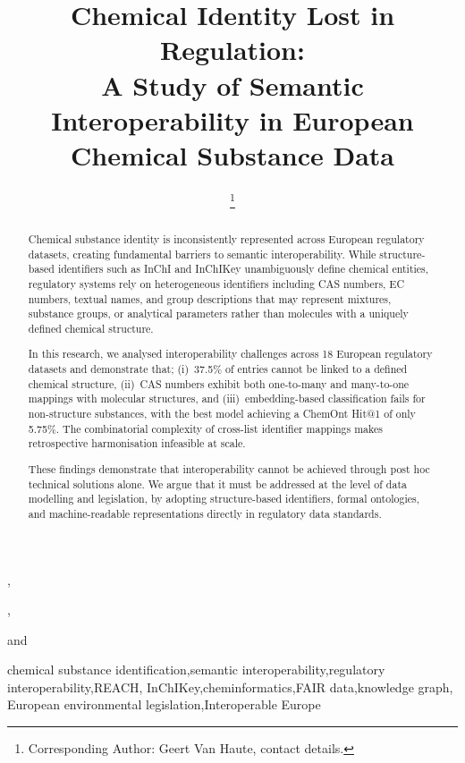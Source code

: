 \begin{frontmatter}              %


\title{Chemical Identity Lost in Regulation\@:\\A Study of Semantic Interoperability in European Chemical Substance Data}

\ifblindreview\else
\author[A]{ %
\thanks{Corresponding Author: Geert Van Haute, contact details.}},
\author[A]{ }
,
\author[A]{ }
and
\author[A]{ }

\address[A]{Department of Environment and Spatial Development, Flemish Government, Belgium}
\fi


\begin{abstract}
    Chemical substance identity is inconsistently represented across European regulatory datasets, creating fundamental barriers to semantic interoperability. While structure-based identifiers such as InChI and InChIKey unambiguously define chemical entities, regulatory systems rely on heterogeneous identifiers including CAS numbers, EC numbers, textual names, and group descriptions that may represent mixtures, substance groups, or analytical parameters rather than molecules with a uniquely defined chemical structure.

    In this research, we analysed interoperability challenges across 18 European regulatory datasets and demonstrate that; (i)~37.5\% of entries cannot be linked to a defined chemical structure, (ii)~CAS numbers exhibit both one-to-many and many-to-one mappings with molecular structures, and (iii)~embedding-based classification fails for non-structure substances, with the best model achieving a ChemOnt Hit@1 of only 5.75\%. The combinatorial complexity of cross-list identifier mappings makes retrospective harmonisation infeasible at scale.

    These findings demonstrate that interoperability cannot be achieved through post hoc technical solutions alone. We argue that it must be addressed at the level of data modelling and legislation, by adopting structure-based identifiers, formal ontologies, and machine-readable representations directly in regulatory data standards.
\end{abstract}



\begin{keyword}
chemical substance identification\sep semantic interoperability\sep regulatory interoperability\sep REACH\sep
InChIKey\sep cheminformatics\sep FAIR data\sep knowledge graph\sep
European environmental legislation\sep Interoperable Europe
\end{keyword}
\end{frontmatter}
